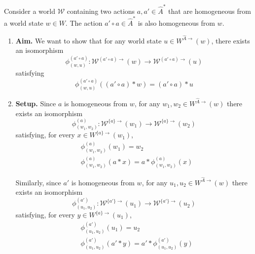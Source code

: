 \begin{propositionE}
    Consider a world $\mathscr{W}$ containing two actions $a, a' \in \hat{A}^{*}$ that are homogeneous from a world state $w \in W$.
    The action $a' \circ a \in \hat{A}^{*}$ is also homogeneous from $w$.
\end{propositionE}
\begin{proofE}
\begin{enumerate}
    \item \textbf{Aim.}
    We want to show that for any world state $u \in W^{\hat{A}\to}(w)$, there exists an isomorphism
    \begin{equation}
        \phi^{(a' \circ a)}_{(w,u)} : \mathscr{W}^{(a' \circ a)\to}(w) \to \mathscr{W}^{(a' \circ a)\to}(u)
    \end{equation}
    satisfying
    \begin{equation}
        \phi^{(a' \circ a)}_{(w,u)} ( (a' \circ a) \ast w) = (a' \circ a) \ast u
    \end{equation}

    \item \textbf{Setup.}
    Since $a$ is homogeneous from $w$, for any $w_{1}, w_{2} \in W^{\hat{A}\to}(w)$ there exists an isomorphism
    \begin{equation}
        \phi_{(w_{1}, w_{2})}^{(a)}: \mathscr{W}^{\{a\}\to}(w_{1}) \to \mathscr{W}^{\{a\}\to}(w_{2})
    \end{equation}
    satisfying, for every $x \in W^{\{a\}\to}(w_{1})$,
    \begin{align}
        & \phi_{(w_{1}, w_{2})}^{(a)}(w_{1}) = w_{2} \\
        & \phi_{(w_{1}, w_{2})}^{(a)}(a \ast x) = a \ast \phi_{(w_{1}, w_{2})}^{(a)}(x)
    \end{align}

    Similarly, since $a'$ is homogeneous from $w$, for any $u_{1}, u_{2} \in W^{\hat{A}\to}(w)$ there exists an isomorphism
    \begin{equation}
        \phi_{(u_{1}, u_{2})}^{(a')}: \mathscr{W}^{\{a'\}\to}(u_{1}) \to \mathscr{W}^{\{a'\}\to}(u_{2})
    \end{equation}
    satisfying, for every $y \in W^{\{a\}\to}(u_{1})$,
    \begin{align}
        & \phi_{(u_{1}, u_{2})}^{(a')}(u_{1}) = u_{2} \\
        & \phi_{(u_{1}, u_{2})}^{(a')}(a' \ast y) = a' \ast \phi_{(u_{1}, u_{2})}^{(a')}(y)
    \end{align}


\end{enumerate}
\end{proofE}
